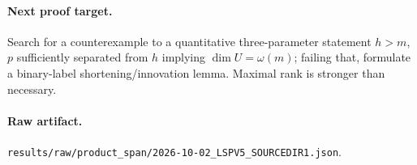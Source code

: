 \documentclass[11pt]{article}
\begin{document}
\paragraph{Next proof target.} Search for a counterexample to a quantitative three-parameter statement \(h>m\), \(p\) sufficiently separated from \(h\) implying \(\dim U=\omega(m)\); failing that, formulate a binary-label shortening/innovation lemma. Maximal rank is stronger than necessary.

\paragraph{Raw artifact.} \texttt{results/raw/product_span/2026-10-02_LSPV5_SOURCEDIR1.json}.
\end{document}

